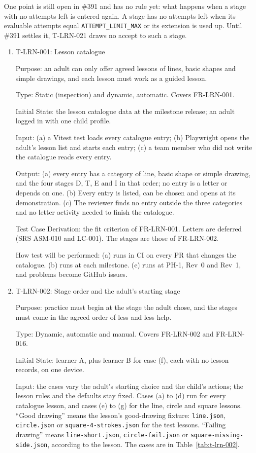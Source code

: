 \documentclass[12pt, titlepage]{article}
\newcommand{\testitem}[1]{\item #1\par\nopagebreak}
\begin{document}
One point is still open in \#391 and has no rule yet: what happens when a
stage with no attempts left is entered again. A stage has no attempts left
when its evaluable attempts equal \texttt{ATTEMPT\_LIMIT\_MAX} or its
extension is used up. Until \#391 settles it, T-LRN-021 draws no accept to
such a stage.

\begin{enumerate}

\testitem{T-LRN-001: Lesson catalogue}

Purpose: an adult can only offer agreed lessons of lines, basic shapes and
simple drawings, and each lesson must work as a guided lesson.

Type: Static (inspection) and dynamic, automatic. Covers FR-LRN-001.

Initial State: the lesson catalogue data at the milestone release; an adult
logged in with one child profile.

Input: (a) a Vitest test loads every catalogue entry; (b) Playwright opens
the adult's lesson list and starts each entry; (c) a team member who did
not write the catalogue reads every entry.

Output: (a) every entry has a category of line, basic shape or simple
drawing, and the four stages D, T, E and I in that order; no entry is a
letter or depends on one. (b) Every entry is listed, can be chosen and
opens at its demonstration. (c) The reviewer finds no entry outside the
three categories and no letter activity needed to finish the catalogue.

Test Case Derivation: the fit criterion of FR-LRN-001. Letters are deferred
(SRS ASM-010 and LC-001). The stages are those of FR-LRN-002.

How test will be performed: (a) runs in CI on every PR that changes the
catalogue. (b) runs at each milestone. (c) runs at PH-1, Rev~0 and Rev~1,
and problems become GitHub issues.

\testitem{T-LRN-002: Stage order and the adult's starting stage}

Purpose: practice must begin at the stage the adult chose, and the stages
must come in the agreed order of less and less help.

Type: Dynamic, automatic and manual. Covers FR-LRN-002 and FR-LRN-016.

Initial State: learner A, plus learner B for case (f), each with no lesson
records, on one device.

Input: the cases vary the adult's starting choice and the child's actions;
the lesson rules and the defaults stay fixed. Cases (a) to (d) run for every
catalogue lesson, and cases (e) to (g) for the line, circle and square
lessons. ``Good drawing'' means the lesson's good-drawing fixture:
\texttt{line.json}, \texttt{circle.json} or
\texttt{square-\allowbreak{}4-\allowbreak{}strokes.json} for the test
lessons. ``Failing drawing'' means \texttt{line-\allowbreak{}short.json},
\texttt{circle-\allowbreak{}fail.json} or
\texttt{square-\allowbreak{}missing-\allowbreak{}side.json}, according to
the lesson. The cases are in Table~\ref{tab:t-lrn-002}.


\end{enumerate}
\end{document}
